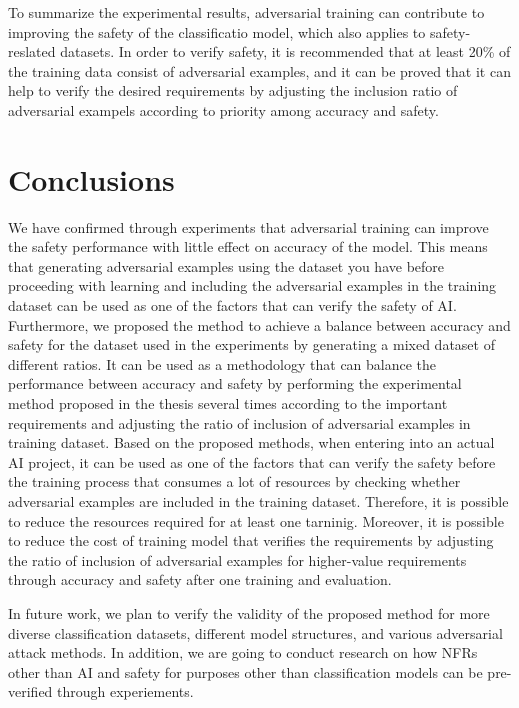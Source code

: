 \documentclass[journal,article,submit,moreauthors,pdftex]{Definitions/mdpi}
\begin{document}
To summarize the experimental results, adversarial training can contribute to improving the safety of the classificatio model, which also applies to safety-reslated datasets.
In order to verify safety, it is recommended that at least 20\% of the training data consist of adversarial examples, and it can be proved that it can help to verify the desired requirements by adjusting the inclusion ratio of adversarial exampels according to priority among accuracy and safety.

\section{Conclusions}

We have confirmed through experiments that adversarial training can improve the safety performance with little effect on accuracy of the model.
This means that generating adversarial examples using the dataset you have before proceeding with learning and including the adversarial examples in the training dataset can be used as one of the factors that can verify the safety of AI.
Furthermore, we proposed the method to achieve a balance between accuracy and safety for the dataset used in the experiments by generating a mixed dataset of different ratios.
It can be used as a methodology that can balance the performance between accuracy and safety by performing the experimental method proposed in the thesis several times according to the important requirements and adjusting the ratio of inclusion of adversarial examples in training dataset.
Based on the proposed methods, when entering into an actual AI project, it can be used as one of the factors that can verify the safety before the training process that consumes a lot of resources by checking whether adversarial examples are included in the training dataset. Therefore, it is possible to reduce the resources required for at least one tarninig.
Moreover, it is possible to reduce the cost of training model that verifies the requirements by adjusting the ratio of inclusion of adversarial examples for higher-value requirements through accuracy and safety after one training and evaluation.

In future work, we plan to verify the validity of the proposed method for more diverse classification datasets, different model structures, and various adversarial attack methods.
In addition, we are going to conduct research on how NFRs other than AI and safety for purposes other than classification models can be pre-verified through experiements.
\end{document}
